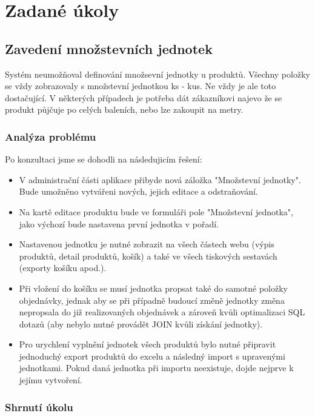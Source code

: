 \chapter{Zadané úkoly}

\section{Zavedení množstevních jednotek}

Systém neumožňoval definování množsevní jednotky u produktů. Všechny položky se vždy zobrazovaly s množstevní jednotkou ks - kus. Ne vždy je ale toto dostačující. V některých případech je potřeba dát zákazníkovi najevo že se produkt půjčuje po celých baleních, nebo lze zakoupit na metry.

\subsection{Analýza problému}

Po konzultaci jsme se dohodli na následujicím řešení:



\begin{itemize}
    \item V administrační části aplikace přibyde nová záložka "Množstevní jednotky". Bude umožněno vytvářeni nových, jejich editace a odstraňování.
    \item Na kartě editace produktu bude ve formuláři pole "Množstevní jednotka", jako výchozí bude nastavena první jednotka v pořadí.
    \item Nastavenou jednotku je nutné zobrazit na všech částech webu (výpis produktů, detail produktů, košík) a také ve všech tiskových sestavách (exporty košíku apod.). 
    \item Při vložení do košíku se musí jednotka propsat také do samotné položky objednávky, jednak aby se při případně budoucí změně jednotky změna nepropsala do již realizovaných objednávek a zároveň kvůli optimalizaci SQL dotazů (aby nebylo nutné provádět JOIN kvůli získání jednotky).
    \item Pro urychlení vyplnění jednotek všech produktů bylo nutné připravit jednoduchý export produktů do excelu a následný import s upravenými jednotkami. Pokud daná jednotka při importu neexistuje, dojde nejprve k jejímu vytvoření.
\end{itemize}

\subsection{Shrnutí úkolu}

